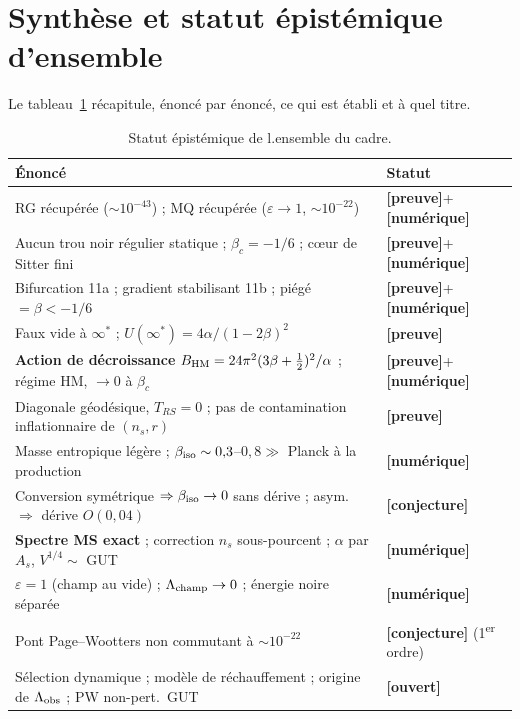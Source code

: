 \documentclass[11pt,a4paper]{article}
\newcommand{\st}[1]{\textbf{\textcolor{blue!45!black}{[#1]}}}
\newcommand{\fpole}{\infty^*}
\begin{document}
\section{Synthèse et statut épistémique d'ensemble}
Le tableau~\ref{tab:statut} récapitule, énoncé par énoncé, ce qui est établi et à quel titre.
\begin{table}[ht]\centering\small
\begin{tabular}{p{}l}
\toprule
Énoncé & Statut \\
\midrule
RG récupérée ($\sim10^{-43}$) ; MQ récupérée ($\varepsilon\to1$, $\sim10^{-22}$) & \st{preuve}+\st{numérique} \\
Aucun trou noir régulier statique ; $\beta_c=-1/6$ ; cœur de Sitter fini & \st{preuve}+\st{numérique} \\
Bifurcation 11a ; gradient stabilisant 11b ; piégé $=\beta<-1/6$ & \st{preuve}+\st{numérique} \\
Faux vide à $\fpole$ ; $U(\fpole)=4\alpha/(1-2\beta)^2$ & \st{preuve} \\
\textbf{Action de décroissance} $B_{\rm HM}=24\pi^2(3\beta+\tfrac12)^2/\alpha$ ; régime HM, $\to0$ à $\beta_c$ & \st{preuve}+\st{numérique} \\
Diagonale géodésique, $T_{RS}=0$ ; pas de contamination inflationnaire de $(n_s,r)$ & \st{preuve} \\
Masse entropique légère ; $\beta_{\rm iso}\sim0{,}3$–$0{,}8\gg$ Planck à la production & \st{numérique} \\
Conversion symétrique $\Rightarrow\beta_{\rm iso}\to0$ sans dérive ; asym.\ $\Rightarrow$ dérive $O(0{,}04)$ & \st{conjecture} \\
\textbf{Spectre MS exact} ; correction $n_s$ sous-pourcent ; $\alpha$ par $A_s$, $V^{1/4}\!\sim$ GUT & \st{numérique} \\
$\varepsilon=1$ (champ au vide) ; $\Lambda_{\rm champ}\to0$ ; énergie noire séparée & \st{numérique} \\
Pont Page–Wootters non commutant à $\sim10^{-22}$ & \st{conjecture} (1\textsuperscript{er} ordre) \\
Sélection dynamique ; modèle de réchauffement ; origine de $\Lambda_{\rm obs}$ ; PW non-pert.\ GUT & \st{ouvert} \\
\bottomrule
\end{tabular}
\caption{\small Statut épistémique de l.ensemble du cadre.}\label{tab:statut}
\end{table}
\end{document}
